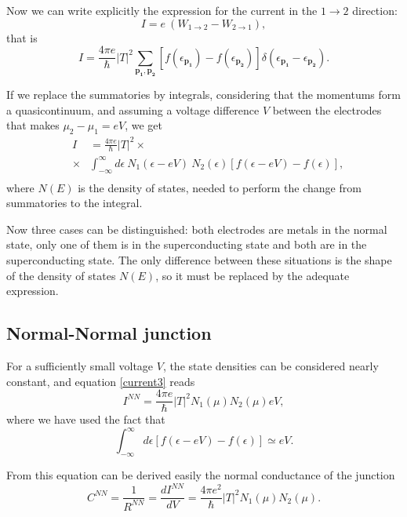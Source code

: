 Now we can write explicitly the expression for the current in the $1\to 2$ direction:
\begin{equation}\label{current1}
I = e\ (W_{1\to 2} - W_{2\to 1}),
\end{equation}
that is
\begin{equation}\label{current2}
I = \frac{4\pi e}{\hbar} |T|^2 \sum_{\mathbf{p_1},\mathbf{p_2}}  
		[f(\epsilon_{\mathbf{p_1}})-f(\epsilon_{\mathbf{p_2}})] 
		\delta(\epsilon_{\mathbf{p_1}}-\epsilon_{\mathbf{p_2}}).
\end{equation}

If we replace the summatories by integrals, considering that the momentums form a quasicontinuum, and assuming a voltage difference $V$ between the electrodes that makes $\mu_2-\mu_1=eV$, we get
\begin{eqnarray}\label{current3}
&I& = \frac{4\pi e}{\hbar}  |T|^2 \times
	\nonumber \\
	&\times& \int_{-\infty}^{\infty} d\epsilon\ N_1(\epsilon-eV)\ N_2(\epsilon) [f(\epsilon-eV)-f(\epsilon)],
	\nonumber \\
\end{eqnarray}
where $N(E)$ is the density of states, needed to perform the change from summatories to the integral.

Now three cases can be distinguished: both electrodes are metals in the normal state, only one of them is in the superconducting state and both are in the superconducting state. The only difference between these situations is the shape of the density of states $N(E)$, so it must be replaced by the adequate expression.

\subsection{Normal-Normal junction}
For a sufficiently small voltage $V$, the state densities can be considered nearly constant, and equation \eqref{current3} reads
\begin{equation}\label{inn}
I^{NN} = \frac{4\pi e}{\hbar} |T|^2 N_1(\mu)N_2(\mu) eV,
\end{equation}
where we have used the fact that $$ \int_{-\infty}^{\infty}d\epsilon [f(\epsilon-eV)-f(\epsilon)] \simeq eV. $$

From this equation can be derived easily the normal conductance of the junction
\begin{equation}\label{cnn}
C^{NN} = \frac{1}{R^{NN}} = \frac{dI^{NN}}{dV} = \frac{4\pi e^2}{\hbar} |T|^2 N_1(\mu)N_2(\mu).
\end{equation}


